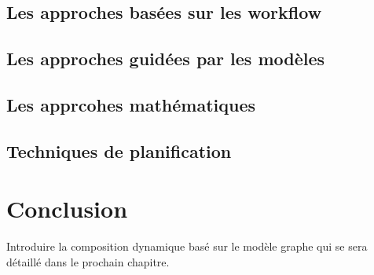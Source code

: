 
    \subsection{Les approches basées sur les workflow}
    \label{sec:les-approches-basees}

    \subsection{Les approches guidées par les modèles}
    \label{sec:les-appr-guid}

    \subsection{Les apprcohes mathématiques}
    \label{sec:les-apprc-math}
   
    \subsection{Techniques de planification}    
    \label{sec:techn-de-plan}

  \section{Conclusion}
  \label{sec:conclusion}
  Introduire la composition dynamique basé sur le modèle graphe qui se
  sera détaillé dans le prochain chapitre.
 

